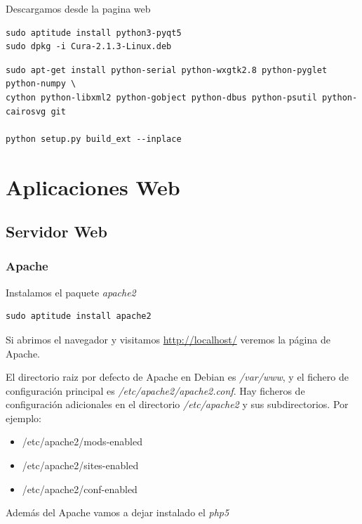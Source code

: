 \documentclass[12pt,spanish,]{article}
\providecommand{\tightlist}{%
  \setlength{\itemsep}{0pt}\setlength{\parskip}{0pt}}
\begin{document}
Descargamos desde la pagina web

\begin{verbatim}
sudo aptitude install python3-pyqt5
sudo dpkg -i Cura-2.1.3-Linux.deb
\end{verbatim}

\begin{verbatim}
sudo apt-get install python-serial python-wxgtk2.8 python-pyglet python-numpy \
cython python-libxml2 python-gobject python-dbus python-psutil python-cairosvg git

python setup.py build_ext --inplace
\end{verbatim}

\section{Aplicaciones Web}\label{aplicaciones-web}

\subsection{Servidor Web}\label{servidor-web}

\subsubsection{Apache}\label{apache}

Instalamos el paquete \emph{apache2}

\begin{verbatim}
sudo aptitude install apache2
\end{verbatim}

Si abrimos el navegador y visitamos \url{http://localhost/} veremos la
página de Apache.

El directorio raiz por defecto de Apache en Debian es \emph{/var/www}, y
el fichero de configuración principal es
\emph{/etc/apache2/apache2.conf}. Hay ficheros de configuración
adicionales en el directorio \emph{/etc/apache2} y sus subdirectorios.
Por ejemplo:

\begin{itemize}
\tightlist
\item
  /etc/apache2/mods-enabled
\item
  /etc/apache2/sites-enabled
\item
  /etc/apache2/conf-enabled
\end{itemize}

Además del Apache vamos a dejar instalado el \emph{php5}
\end{document}
